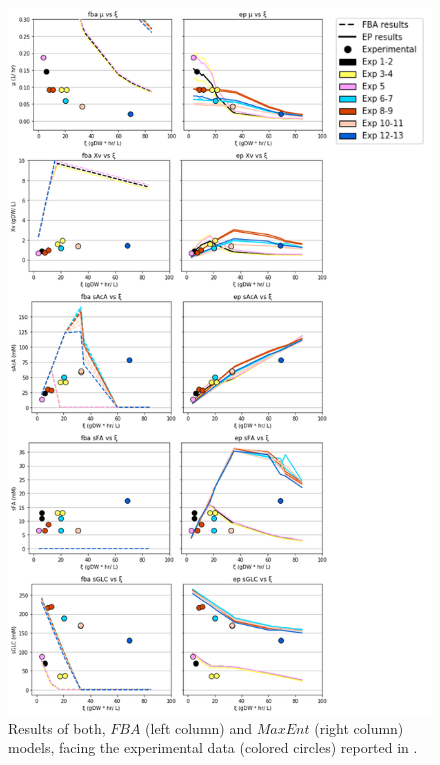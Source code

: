 \documentclass[]{article}
\begin{document}
	\begin{figure}
		\centering
		\includegraphics[scale = 0.8]{plots_s_EColi}
		\caption{Results of both, $FBA$ (left column) and $MaxEnt$ (right column) models, facing the experimental data (colored circles) reported in .}
	\end{figure}
\end{document}
